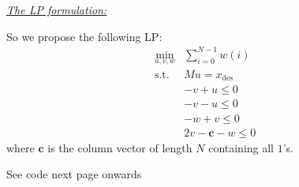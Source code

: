 \textit{\underline{The LP formulation:}}

So we propose the following LP:
\[\begin{aligned}
\min_{u,v,w} &\sum_{i=0}^{N-1} w(i)\\
\text{s.t. } 
&M u = x_{\text{des}}\\
&-v+u\le 0\\
&-v-u\le 0\\
&-w+v\le 0\\
&2v-\pmb c -w\le 0
\end{aligned}\]
where $\pmb c$ is the column vector of length $N$ containing all $1$'s. 


See code next page onwards


%
%
%
%

{}



